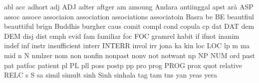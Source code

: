 abl
acc
adhort
adj
ADJ
adter
aftger
am
amoung
Andara
antiinggal
apst
arà
ASP
assoc
assoce
associaion
association
associations
associatoin
Basra
be
BE
beautfiul
beauttiful
brign
Buddhis
burgher
caus
comit
compl
cond
copula
cp  
dat
DAT  
dem
DEM    
disj
dist 
emph  
evid 
fam
familiar
foc
FOC    
gramrel
habit  
if
ifnot
inanim
indef 
inf 
instr
insufficient
interr
INTERR
invol
irr 
jona
ka 
kin   
loc
LOC 
lp 
m
ma  
mid 
n
N
nmlzer 
nom 
non
nonfin
nonpast
nonv
not
notwant
np
NP
NUM 
ord  
past 
pat
patfoc
patient
pl
PL
pll      
poss
postp
pp
pro
prog
PROG 
prox 
quot  
relative
RELC 
s
S
sa 
simil
simult
sinh
Sinh
sinhala  
tag
tam
tns    
yan
yeas
yera
